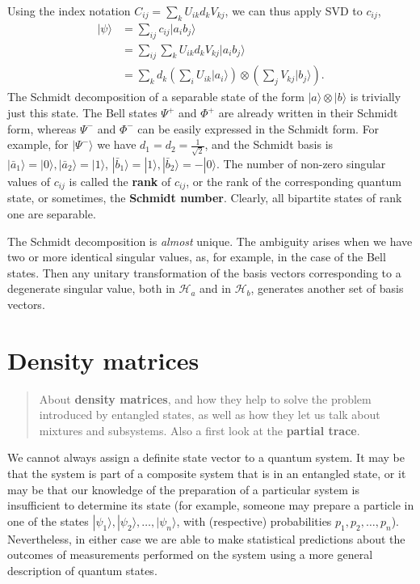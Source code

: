 \documentclass[fleqn]{article}
\let\oldsection\section
\renewcommand\section{\clearpage\oldsection}
\begin{document}
Using the index notation \(C_{ij} = \sum_k U_{ik}d_k V_{kj}\), we can thus apply SVD to \(c_{ij}\),
\[
  \begin{aligned}
    |\psi\rangle
    &= \sum_{ij} c_{ij}|a_ib_j\rangle
  \\&= \sum_{ij} \sum_k U_{ik}d_k V_{kj}|a_ib_j\rangle
  \\&= \sum_k d_k \left(\sum_i U_{ik}|a_i\rangle\right)\otimes\left(\sum_j V_{kj}|b_j\rangle\right).
  \end{aligned}
\]
The Schmidt decomposition of a separable state of the form
\(|a\rangle\otimes|b\rangle\) is trivially just this state.
The Bell states \(\Psi^+\) and \(\Phi^+\) are already written in their Schmidt form, whereas \(\Psi^-\) and \(\Phi^-\) can be easily expressed in the Schmidt form.
For example, for \(|\Psi^-\rangle\) we have \(d_1 = d_2 = \frac{1}{\sqrt 2}\), and the Schmidt basis is \(|\bar a_1\rangle =|0\rangle, |\bar a_2\rangle=|1\rangle\), \(|\bar b_1\rangle = |1\rangle, |\bar b_2\rangle=-|0\rangle\).
The number of non-zero singular values of \(c_{ij}\) is called the \textbf{rank} of \(c_{ij}\), or the rank of the corresponding quantum state, or sometimes, the \textbf{Schmidt number}.
Clearly, all bipartite states of rank one are separable.

The Schmidt decomposition is \emph{almost} unique.
The ambiguity arises when we have two or more identical singular values, as, for example, in the case of the Bell states.
Then any unitary transformation of the basis vectors corresponding to a degenerate singular value, both in \(\mathcal{H}_a\) and in \(\mathcal{H}_b\), generates another set of basis vectors.

\hypertarget{chapter6}{%
\section{Density matrices}\label{chapter6}}

\begin{quote}
About \textbf{density matrices}, and how they help to solve the problem introduced by entangled states, as well as how they let us talk about mixtures and subsystems.
Also a first look at the \textbf{partial trace}.
\end{quote}

We cannot always assign a definite state vector to a quantum system.
It may be that the system is part of a composite system that is in an entangled state, or it may be that our knowledge of the preparation of a particular system is insufficient to determine its state (for example, someone may prepare a particle in one of the states \(|\psi_1\rangle, |\psi_2\rangle, \ldots, |\psi_n\rangle\), with (respective) probabilities \(p_1, p_2, \ldots, p_n\)).
Nevertheless, in either case we are able to make statistical predictions about the outcomes of measurements performed on the system using a more general description of quantum states.
\end{document}

